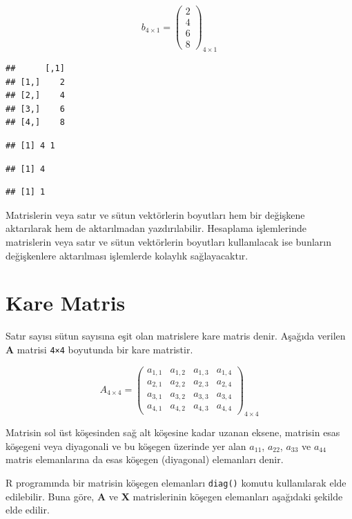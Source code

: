 \documentclass[
]{book}
\begin{document}
\[b_{4×1} =
\begin{pmatrix}
 2 \\ 
 4 \\
 6 \\
 8
\end{pmatrix}_{4×1}\]

\begin{verbatim}
##      [,1]
## [1,]    2
## [2,]    4
## [3,]    6
## [4,]    8
\end{verbatim}

\begin{verbatim}
## [1] 4 1
\end{verbatim}

\begin{verbatim}
## [1] 4
\end{verbatim}

\begin{verbatim}
## [1] 1
\end{verbatim}

Matrislerin veya satır ve sütun vektörlerin boyutları hem bir değişkene aktarılarak hem de aktarılmadan yazdırılabilir. Hesaplama işlemlerinde matrislerin veya satır ve sütun vektörlerin boyutları kullanılacak ise bunların değişkenlere aktarılması işlemlerde kolaylık sağlayacaktır.

\section{Kare Matris}\label{kare-matris}

Satır sayısı sütun sayısına eşit olan matrislere kare matris denir. Aşağıda verilen \textbf{A} matrisi \texttt{4×4} boyutunda bir kare matristir.

\[A_{4×4} =
\begin{pmatrix}
 a_{1,1} & a_{1,2} & a_{1,3} & a_{1,4} \\
 a_{2,1} & a_{2,2} & a_{2,3} & a_{2,4} \\
 a_{3,1} & a_{3,2} & a_{3,3} & a_{3,4} \\
 a_{4,1} & a_{4,2} & a_{4,3} & a_{4,4} 
\end{pmatrix}_{4×4}\]

Matrisin sol üst köşesinden sağ alt köşesine kadar uzanan eksene, matrisin esas köşegeni veya diyagonali ve bu köşegen üzerinde yer alan \(a_{11}\), \(a_{22}\), \(a_{33}\) ve \(a_{44}\) matris elemanlarına da esas köşegen (diyagonal) elemanları denir.

R programında bir matrisin köşegen elemanları \texttt{diag()} komutu kullanılarak elde edilebilir. Buna göre, \textbf{A} ve \textbf{X} matrislerinin köşegen elemanları aşağıdaki şekilde elde edilir.
\end{document}
